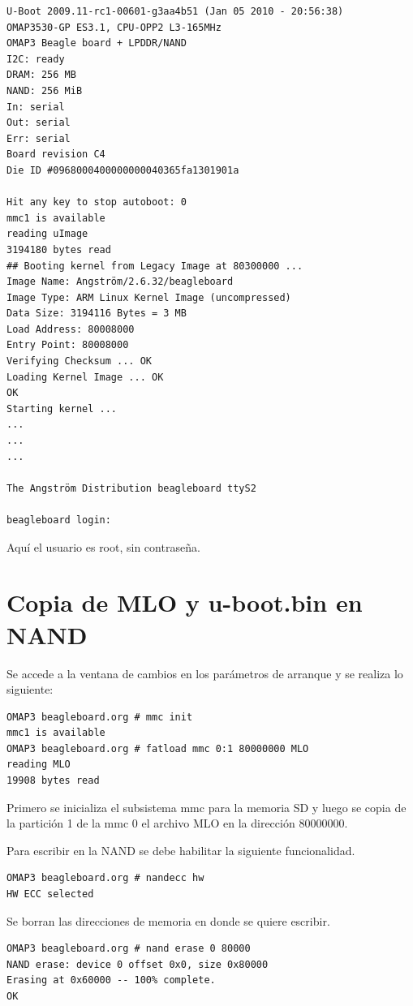 \begin{verbatim}
U-Boot 2009.11-rc1-00601-g3aa4b51 (Jan 05 2010 - 20:56:38) 
OMAP3530-GP ES3.1, CPU-OPP2 L3-165MHz 
OMAP3 Beagle board + LPDDR/NAND 
I2C: ready 
DRAM: 256 MB 
NAND: 256 MiB 
In: serial 
Out: serial 
Err: serial 
Board revision C4 
Die ID #0968000400000000040365fa1301901a 

Hit any key to stop autoboot: 0 
mmc1 is available 
reading uImage 
3194180 bytes read 
## Booting kernel from Legacy Image at 80300000 ... 
Image Name: Angström/2.6.32/beagleboard 
Image Type: ARM Linux Kernel Image (uncompressed) 
Data Size: 3194116 Bytes = 3 MB 
Load Address: 80008000 
Entry Point: 80008000 
Verifying Checksum ... OK 
Loading Kernel Image ... OK 
OK 
Starting kernel ... 
... 
... 
... 

The Angström Distribution beagleboard ttyS2 

beagleboard login: 
\end{verbatim}

Aquí el usuario es root, sin contraseña.

\newpage
\section{Copia de MLO y u-boot.bin en NAND}\label{copyNAND}

Se accede a la ventana de cambios en los parámetros de arranque y se realiza lo siguiente:

\begin{verbatim}
OMAP3 beagleboard.org # mmc init 
mmc1 is available 
OMAP3 beagleboard.org # fatload mmc 0:1 80000000 MLO 
reading MLO 
19908 bytes read 
\end{verbatim}

Primero se inicializa el subsistema mmc para la memoria SD y luego se copia de la partición 1 de la mmc 0 el archivo MLO en la dirección 80000000.

\bigskip
Para escribir en la NAND se debe habilitar la siguiente funcionalidad.
\begin{verbatim}
OMAP3 beagleboard.org # nandecc hw 
HW ECC selected 
\end{verbatim}

Se borran las direcciones de memoria en donde se quiere escribir.
\begin{verbatim}
OMAP3 beagleboard.org # nand erase 0 80000 
NAND erase: device 0 offset 0x0, size 0x80000 
Erasing at 0x60000 -- 100% complete. 
OK 
\end{verbatim}

